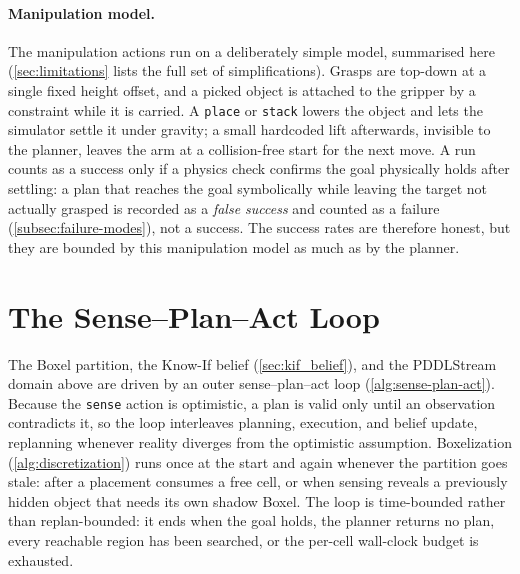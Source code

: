\paragraph{Manipulation model.} The manipulation actions run on a deliberately simple model, summarised here (\cref{sec:limitations} lists the full set of simplifications). Grasps are top-down at a single fixed height offset, and a picked object is attached to the gripper by a constraint while it is carried. A \texttt{place} or \texttt{stack} lowers the object and lets the simulator settle it under gravity; a small hardcoded lift afterwards, invisible to the planner, leaves the arm at a collision-free start for the next move. A run counts as a success only if a physics check confirms the goal physically holds after settling: a plan that reaches the goal symbolically while leaving the target not actually grasped is recorded as a \emph{false success} and counted as a failure (\cref{subsec:failure-modes}), not a success. The success rates are therefore honest, but they are bounded by this manipulation model as much as by the planner.

\section{The Sense--Plan--Act Loop}
\label{sec:sense-plan-act}
The Boxel partition, the Know-If belief (\cref{sec:kif_belief}), and the PDDLStream domain above are driven by an outer sense--plan--act loop (\cref{alg:sense-plan-act}). Because the \texttt{sense} action is optimistic, a plan is valid only until an observation contradicts it, so the loop interleaves planning, execution, and belief update, replanning whenever reality diverges from the optimistic assumption. Boxelization (\cref{alg:discretization}) runs once at the start and again whenever the partition goes stale: after a placement consumes a free cell, or when sensing reveals a previously hidden object that needs its own shadow Boxel. The loop is time-bounded rather than replan-bounded: it ends when the goal holds, the planner returns no plan, every reachable region has been searched, or the per-cell wall-clock budget is exhausted.

